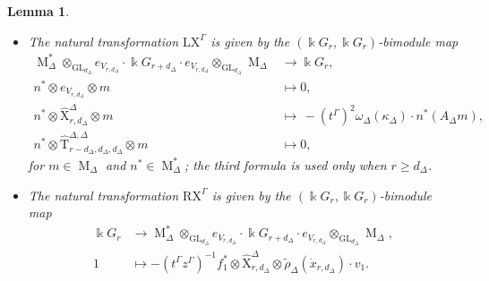 \documentclass[12pt]{amsart}
\numberwithin{itemcounter}{subsection}
\theoremstyle{plain}
\newtheorem{lemma}[theorem]{Lemma}
\theoremstyle{definition}
\theoremstyle{remark}
\numberwithin{equation}{section}
\def\k{\Bbbk}
\def\calI{\mathcal{I}}
\def\GL{\mathrm{GL}}
\def\M{{\operatorname{M}\nolimits}}
\def\RX{\mathrm{RX}}
\def\LX{\mathrm{LX}}
\DeclareMathOperator*{\ot}{\otimes}
\begin{document}
\begin{lemma}\label{lrdots}
\begin{itemize}
Assume that $\Gamma\in \calI_{-2}(\k)$ and let $\Delta$ be an irreducible representative of $\Gamma$.
\item[$(a)$]
 The natural transformation $\LX^\Gamma$ is given by the $( \k G_r , \k G_r )$-bimodule map
\begin{align*} \M^*_\Delta\otimes_{\GL_{d_\Delta}}e_{V_{r,d_\Delta}} \cdot  \k G_{r+d_\Delta}  \cdot e_{V_{r,d_\Delta}}\otimes_{\GL_{d_\Delta}} \M_\Delta  &\to  \k G_r ,\\
  n^*\otimes e_{V_{r,d_\Delta}}
\otimes m&\mapsto 0,\\
 n^*\otimes \widehat{\mathrm{X}}^\Delta_{r,d_\Delta}\otimes m &\mapsto\,-(t^\Gamma)^{2}\omega_\Delta(\kappa_\Delta)\cdot n^*(A_\Delta m),\\
n^*\otimes \widehat{\mathrm{T}}^{\Delta,\Delta}_{r-d_\Delta,d_\Delta,d_\Delta}\otimes m&\mapsto 0,\end{align*}
for $m\in\M_\Delta$ and $n^*\in \M_\Delta^*$; the third formula is used only when $r\ge d_\Delta$.
\item[$(b)$]
The natural transformation $\RX^\Gamma$ is  given by the $( \k G_r , \k G_r )$-bimodule map
\begin{align*} \k G_r  &\to \M^*_\Delta\ot_{\GL_{d_\Delta}}e_{V_{r,d_\Delta}} \cdot  \k G_{r+d_\Delta}  \cdot e_{V_{r,d_\Delta}}\ot_{\GL_{d_\Delta}} \M_\Delta ,\\
1&\mapsto  -({t^\Gamma z^\Gamma})^{-1} f^*_1 \otimes \widehat{\mathrm{X}}^\Delta_{r,d_\Delta}\otimes\tilde{\rho}_\Delta(\dot{x}_{r,d_\Delta})\cdot v_1 .\end{align*}
\end{itemize}
\end{lemma}
\end{document}
